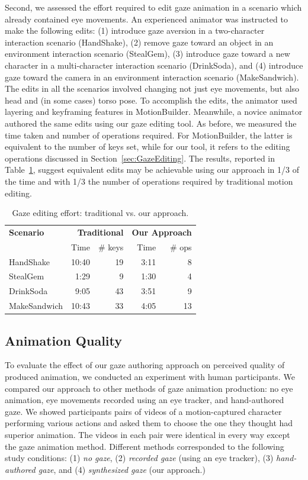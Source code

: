 Second, we assessed the effort required to edit gaze animation in a scenario which already contained eye movements. An experienced animator was instructed to make the following edits: (1) introduce gaze aversion in a two-character interaction scenario (HandShake), (2) remove gaze toward an object in an environment interaction scenario (StealGem), (3) introduce gaze toward a new character in a multi-character interaction scenario (DrinkSoda), and (4) introduce gaze toward the camera in an environment interaction scenario (MakeSandwich). The edits in all the scenarios involved changing not just eye movements, but also head and (in some cases) torso pose. To accomplish the edits, the animator used layering and keyframing features in MotionBuilder. Meanwhile, a novice animator authored the same edits using our gaze editing tool. As before, we measured the time taken and number of operations required. For MotionBuilder, the latter is equivalent to the number of keys set, while for our tool, it refers to the editing operations discussed in Section~\ref{sec:GazeEditing}. The results, reported in Table~\ref{tab:GazeEditingEffortResults}, suggest equivalent edits may be achievable using our approach in 1/3 of the time and with 1/3 the number of operations required by traditional motion editing.
%
\begin{table}
\centering
\def\arraystretch{1.5}
\begin{tabular}{|l|r|r|r|r|}
\hline
\textbf{Scenario} & \multicolumn{2}{r|}{\textbf{Traditional}} & \multicolumn{2}{r|}{\textbf{Our Approach}} \\
\cline{2-5}
& Time & \# keys & Time & \# ops  \\
\hline
HandShake & 10:40 & 19 & 3:11 & 8 \\
StealGem & 1:29 & 9 & 1:30 & 4 \\
DrinkSoda & 9:05 & 43 & 3:51 & 9 \\
MakeSandwich & 10:43 & 33 & 4:05 & 13 \\
\hline
\end{tabular}
\caption{Gaze editing effort: traditional vs. our approach.}
\label{tab:GazeEditingEffortResults}
\end{table}

\subsection{Animation Quality}
\label{sec:GazeAnimationQualityEvaluation}

To evaluate the effect of our gaze authoring approach on perceived quality of produced animation, we conducted an experiment with human participants. We compared our approach to other methods of gaze animation production: no eye animation, eye movements recorded using an eye tracker, and hand-authored gaze. We showed participants pairs of videos of a motion-captured character performing various actions and asked them to choose the one they thought had superior animation. The videos in each pair were identical in every way except the gaze animation method. Different methods corresponded to the following study conditions: (1) \emph{no gaze}, (2) \emph{recorded gaze} (using an eye tracker), (3) \emph{hand-authored gaze}, and (4) \emph{synthesized gaze} (our approach.)

